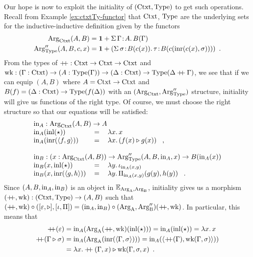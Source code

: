 \documentclass[orivec,envcountsame, ,envcountsect]{llncs}
\begin{document}
Our hope is now to exploit the initiality of $(\text{Ctxt}, \text{Type})$ to get
such operations. Recall from Example \ref{ex:ctxtTy-functor} that
$\text{Ctxt}$, $\text{Type}$ are the underlying sets for the inductive-inductive
definition given by the functors
\begin{align*}
  \text{Arg}_{\text{Ctxt}}(A, B) &= \mathbf{1} + \Sigma\, \Gamma\!:\!A .\, B(\Gamma)\\
  \text{Arg}_{\text{Type}}''(A, B, c, x) &= \mathbf{1} + (\Sigma\,  \sigma\!:\! B(c(x)).\, \tau\!:\!B(c(\text{inr}(c(x), \sigma))) ) \enspace .
\end{align*} %
From the types of $\mathbin{+\mkern-6mu+} : \text{Ctxt} \to \text{Ctxt} \to \text{Ctxt}$ and $\text{wk} :
(\Gamma : \text{Ctxt}) \to (A : \text{Type}(\Gamma)) \to (\Delta : \text{Ctxt}) \to
\text{Type}(\Delta \mathbin{+\mkern-6mu+} \Gamma)$, we see that if we can equip $(A,
B)$ where $A = \text{Ctxt} \to \text{Ctxt}$ and $B(f) = (\Delta : \text{Ctxt}) \to
\text{Type}(f(\Delta))$ with an $(\text{Arg}_{\text{Ctxt}}, \text{Arg}_{\text{Type}}'')$ structure, initiality
will give us functions of the right type. Of course, we must choose
the right structure so that our equations will be satisfied:
\[
\begin{tabular}{lcl}
  \multicolumn{3}{l}{$\inn_A : \ArgCtxt(A, B) \to A$} \\
  $\inn_A(\inl(\oneelt))$ &$=$& $\lambda x .\, x$ \\
  $\inn_A(\inr(\langle f , g\rangle))$ &$=$& $\lambda x .\, (\consCtxt{f(x)}{g(x)})$ \enspace ,\\
\\
  \multicolumn{3}{l}{$\inn_B : (x : \ArgCtxt(A, B)) \to \ArgType''(A, B, \inn_A, x) \to B(\inn_A(x))$} \\
  $\inn_B(x, \inl(\oneelt))$ &$=$& $\lambda y .\, \baseTy{\inn_A(x, y)}$ \\
  $\inn_B(x, \inr(\langle g , h\rangle))$ &$=$& $\lambda y .\, \piTy{\inn_A(x, y)}{g(y)}{h(y)}$ \enspace .
\end{tabular}
\]
Since $(A, B, \text{in}_A, \text{in}_B)$ is an object in
$\mathbb{E}_{\text{Arg}_{\text{A}}, \text{Arg}_{\text{B}}}$, initiality gives us a morphism $(\mathbin{+\mkern-6mu+}, \text{wk}) :
(\text{Ctxt}, \text{Type}) \to (A, B)$ such that $(\mathbin{+\mkern-6mu+}, \text{wk}) \circ
([\varepsilon, \triangleright],
[\iota, \Pi]) = (\text{in}_A, \text{in}_B) \circ (\text{Arg}_{\text{A}},
\text{Arg}_{\text{B}}'')(\mathbin{+\mkern-6mu+}, \text{wk})$.  In particular, this means that
\begin{align*}
\mathbin{+\mkern-6mu+}(\varepsilon) 
 &= \text{in}_A(\text{Arg}_{\text{A}}(\mathbin{+\mkern-6mu+}, \text{wk})(\text{inl}(\star)))
  = \text{in}_A(\text{inl}(\star))
  = \lambda x.\, x \\
\mathbin{+\mkern-6mu+}(\Gamma \triangleright \sigma)
 &= \text{in}_A(\text{Arg}_{\text{A}}(\text{inr}(\langle\Gamma, \sigma\rangle)))
  = \text{in}_A(\langle \mathbin{+\mkern-6mu+}(\Gamma), \text{wk}(\Gamma, \sigma)\rangle)) \\
  &= \lambda x . \mathbin{+\mkern-6mu+}(\Gamma, x) \triangleright \text{wk}(\Gamma, \sigma, x) \enspace .
\end{align*}
\end{document}
